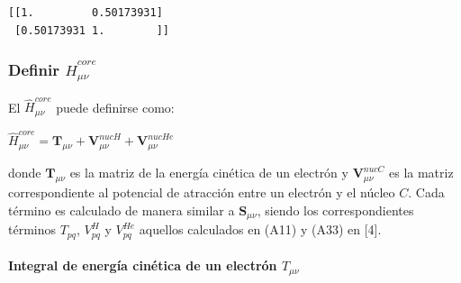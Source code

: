 \documentclass[
  letterpaper,
  DIV=11,
  numbers=noendperiod]{scrreprt}
\let\oldparagraph\paragraph
\renewcommand{\paragraph}[1]{\oldparagraph{#1}\mbox{}}
\begin{document}
\begin{verbatim}
[[1.         0.50173931]
 [0.50173931 1.        ]]
\end{verbatim}

\hypertarget{definir-hathcore_mu-nu-1}{%
\subsubsection{\texorpdfstring{Definir
\(\hat{H}^{core}_{\mu \nu}\)}{Definir \textbackslash hat\{H\}\^{}\{core\}\_\{\textbackslash mu \textbackslash nu\}}}\label{definir-hathcore_mu-nu-1}}

El \(\hat{H}^{core}_{\mu \nu}\) puede definirse como:

\(\hat{H}^{core}_{\mu \nu} = \textbf{T}_{\mu \nu} + \textbf{V}^{nucH}_{\mu \nu} + \textbf{V}^{nucHe}_{\mu \nu}\)

donde \(\textbf{T}_{\mu \nu}\) es la matriz de la energía cinética de un
electrón y \(\textbf{V}^{nucC}_{\mu \nu}\) es la matriz correspondiente
al potencial de atracción entre un electrón y el núcleo \(C\). Cada
término es calculado de manera similar a \(\mathbf{S}_{\mu \nu}\),
siendo los correspondientes términos \(T_{pq}\), \(V^H_{pq}\) y
\(V^{He}_{pq}\) aquellos calculados en (A11) y (A33) en {[}4{]}.

\hypertarget{integral-de-energuxeda-cinuxe9tica-de-un-electruxf3n-t_mu-nu-1}{%
\paragraph{\texorpdfstring{Integral de energía cinética de un electrón
\(T_{\mu \nu}\)}{Integral de energía cinética de un electrón T\_\{\textbackslash mu \textbackslash nu\}}}\label{integral-de-energuxeda-cinuxe9tica-de-un-electruxf3n-t_mu-nu-1}}
\end{document}
